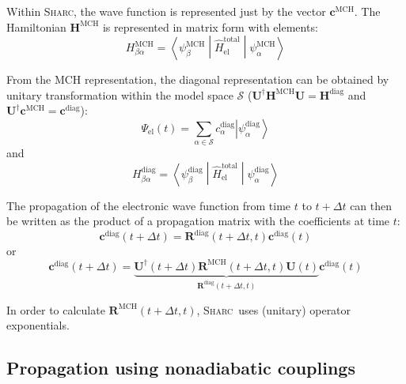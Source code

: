 \documentclass[a4paper,10pt,DIV=15,openany]{scrbook}
\newcommand{\sharc}{\textsc{Sharc}}
\newcommand{\VEC}[1]{\ensuremath{\mathbf{#1}}}
\begin{document}
Within \sharc, the wave function is represented just by the vector $\VEC{c}^{\text{MCH}}$. The Hamiltonian $\VEC{H}^{\text{MCH}}$ is represented in matrix form with elements:
\begin{equation}
  H^{\text{MCH}}_{\beta\alpha}=\left\langle\psi^{\text{MCH}}_\beta\middle|\hat{H}_{\text{el}}^{\text{total}}\middle|\psi^{\text{MCH}}_\alpha\right\rangle
\end{equation}

From the MCH representation, the diagonal representation can be obtained by unitary transformation within the model space $\mathcal{S}$ ($\VEC{U}^\dagger\VEC{H}^{\text{MCH}}\VEC{U}=\VEC{H}^{\text{diag}}$ and $\VEC{U}^\dagger\VEC{c}^{\text{MCH}}=\VEC{c}^{\text{diag}}$):
\begin{equation}
  \Psi_{\text{el}}(t)=\sum\limits_{\alpha\in\mathcal{S}} c^{\text{diag}}_\alpha \left|\psi^{\text{diag}}_\alpha\right\rangle
\end{equation}
and
\begin{equation}
  H^{\text{diag}}_{\beta\alpha}=\left\langle\psi^{\text{diag}}_\beta\middle|\hat{H}_{\text{el}}^{\text{total}}\middle|\psi^{\text{diag}}_\alpha\right\rangle
\end{equation}

The propagation of the electronic wave function from time $t$ to $t+\Delta t$ can then be written as the product of a propagation matrix with the coefficients at time $t$:
\begin{equation}
  \VEC{c}^{\text{diag}}(t+\Delta t)=\VEC{R}^{\text{diag}}(t+\Delta t,t)\VEC{c}^{\text{diag}}(t)
\end{equation}
or
\begin{equation}
  \VEC{c}^{\text{diag}}(t+\Delta t)=\underbrace{\VEC{U}^\dagger(t+\Delta t)\VEC{R}^{\text{MCH}}(t+\Delta t,t)\VEC{U}(t)}_{\VEC{R}^{\text{diag}}(t+\Delta t,t)}\VEC{c}^{\text{diag}}(t)
\end{equation}

In order to calculate $\VEC{R}^{\text{MCH}}(t+\Delta t,t)$, \sharc\ uses (unitary) operator exponentials. 

\subsection{Propagation using nonadiabatic couplings}
\end{document}
